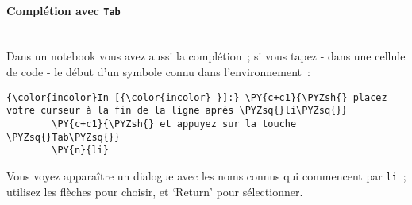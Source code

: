     \hypertarget{compluxe9tion-avec-tab}{%
\paragraph{\texorpdfstring{Complétion avec
\texttt{Tab}}{Complétion avec Tab}\\\\}\label{compluxe9tion-avec-tab}}

    Dans un notebook vous avez aussi la complétion~; si vous tapez - dans
une cellule de code - le début d'un symbole connu dans l'environnement~:

    \begin{Verbatim}[commandchars=\\\{\}]
{\color{incolor}In [{\color{incolor} }]:} \PY{c+c1}{\PYZsh{} placez votre curseur à la fin de la ligne après \PYZsq{}li\PYZsq{}}
        \PY{c+c1}{\PYZsh{} et appuyez sur la touche \PYZsq{}Tab\PYZsq{}}
        \PY{n}{li}
\end{Verbatim}


    Vous voyez apparaître un dialogue avec les noms connus qui commencent
par \texttt{li}~; utilisez les flèches pour choisir, et `Return' pour
sélectionner.